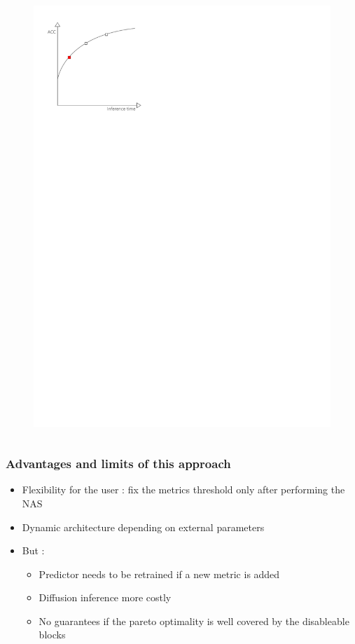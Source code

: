 \documentclass[aspectratio=169,xcolor=dvipsnames]{beamer}
\begin{document}
\begin{frame}
\begin{columns}[c]
\begin{figure}[htbp]
            \includegraphics[width=.8\textwidth]{pareto_front_disabled2.pdf}
        \end{figure}
    \end{columns}
\end{frame}


\begin{frame}
    \frametitle{Advantages and limits of this approach}
    \begin{itemize}
        \item Flexibility for the user : fix the metrics threshold only after performing the NAS
        \item Dynamic architecture depending on external parameters
    \item But :
            \begin{itemize}
                \item Predictor needs to be retrained if a new metric is added
                \item Diffusion inference more costly
                \item No guarantees if the pareto optimality is well covered by the disableable blocks
            \end{itemize}
    \end{itemize}
\end{frame}
\end{document}
